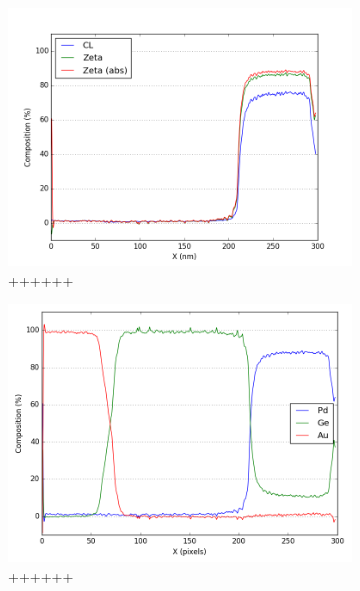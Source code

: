 \begin{figure}
\begin{subfigure}{.5\textwidth}
		\includegraphics[width=\linewidth]{fig/q/2_au}
		\caption{++++++}
		\label{fig:zeta_area1_ge}
	\end{subfigure}%
	\begin{subfigure}{.5\textwidth}
		\centering
		\includegraphics[width=\linewidth]{fig/q/2_all_abscorr}
		\caption{++++++}
		\label{fig:zeta_area1_all}
	\end{subfigure}
		\centering
	\begin{subfigure}{.5\textwidth}

\end{subfigure}
\end{figure}
